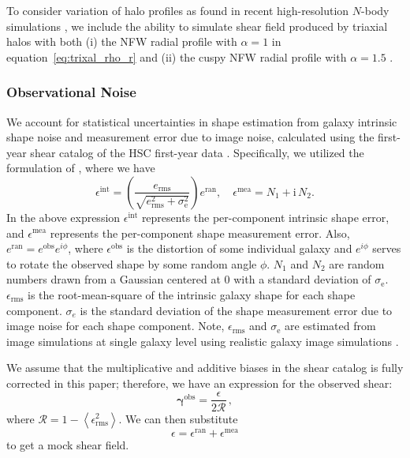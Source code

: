 \documentclass[twocolumn, usenames, dvipsnames]{aastex63}
\begin{document}
To consider variation of halo profiles as found in recent high-resolution
$N$-body simulations \citep{halo_Navarro_2010}, we include the ability to
simulate shear field produced by triaxial halos \citep{halo_JS02} with both (i)
the NFW radial profile with $\alpha=1$ in equation~\eqref{eq:trixal_rho_r}
\citep{halo_nfw} and (ii) the cuspy NFW radial profile with $\alpha=1.5$
\citep{halo_Jing_2000}.


\subsubsection{Observational Noise}
\label{sec:onHalo_noi}

We account for statistical uncertainties in shape estimation from galaxy
intrinsic shape noise and measurement error due to image noise, calculated
using the first-year shear catalog of the HSC first-year data
\citep{Mandelbaum2017_HSCY1}. Specifically, we utilized the formulation of
\cite{shirasaki2019}, where we have
\begin{equation*}
    \epsilon^{\mathrm{int}}=\left(\frac{e_{\mathrm{rms}}}
        {\sqrt{e_{\mathrm{rms}}^2
    + \sigma_{\mathrm{e}}^2}}\right) e^{\mathrm{ran}},
    \quad \epsilon^{\mathrm{mea}}=N_1 + \mathrm{i}\, N_2.
\end{equation*}
In the above expression $\epsilon^{\mathrm{int}}$ represents the per-component
intrinsic shape error, and $\epsilon^\mathrm{mea}$ represents the per-component
shape measurement error. Also, $e^{\mathrm{ran}}=e^{\mathrm{obs}} e^{i \phi}$,
where $\epsilon^{\mathrm{obs}}$ is the distortion of some individual galaxy and
$e^{i\phi}$ serves to rotate the observed shape by some random angle $\phi$.
$N_1$ and $N_2$ are random numbers drawn from a Gaussian centered at $0$ with a
standard deviation of $\sigma_{\mathrm{e}}$. $\epsilon_{\mathrm{rms}}$ is the
root-mean-square of the intrinsic galaxy shape for each shape component.
$\sigma_e$ is the standard deviation of the shape measurement error due to
image noise for each shape component. Note, $\epsilon_{\mathrm{rms}}$ and
$\sigma_{\mathrm{e}}$ are estimated from image simulations at single galaxy
level using realistic galaxy image simulations \citep{HSC1_GREAT3Sim}.

We assume that the multiplicative and additive biases in the shear catalog is
fully corrected in this paper; therefore, we have an expression for the
observed shear:
\begin{equation}
    \boldsymbol{\gamma}^{\mathrm{obs}}=
    \frac{\epsilon}{2 \mathcal{R}}\,,
\end{equation}
where $\mathcal{R} = 1-\left\langle \epsilon_{\mathrm{rms}}^2\right\rangle$. We
can then substitute
$$\epsilon = \epsilon^{\mathrm{ran}} + \epsilon^{\mathrm{mea}}$$
to get a mock shear field.
\end{document}
